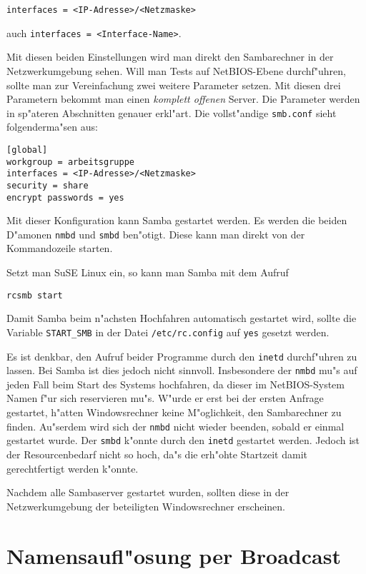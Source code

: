 \documentclass{scrartcl}\usepackage{pslatex}\typearea{12}
\newcommand{\prog}{\texttt}
\newcommand{\dateistyle}{\texttt}
\begin{document}
\begin{verbatim}
interfaces = <IP-Adresse>/<Netzmaske>
\end{verbatim}

\noindent auch \prog{interfaces = <Interface-Name>}.

Mit diesen beiden Einstellungen wird man direkt den Sambarechner in
der Netzwerkumgebung sehen. Will man Tests auf NetBIOS-Ebene
durchf"uhren, sollte man zur Vereinfachung zwei weitere Parameter
setzen. Mit diesen drei Parametern bekommt man einen \emph{komplett
  offenen} Server. Die Parameter werden in sp"ateren Abschnitten
genauer erkl"art. Die vollst"andige \dateistyle{smb.conf} sieht
folgenderma"sen aus:

\begin{verbatim}
[global]
workgroup = arbeitsgruppe
interfaces = <IP-Adresse>/<Netzmaske>
security = share
encrypt passwords = yes
\end{verbatim}

Mit dieser Konfiguration kann Samba gestartet werden. Es werden die
beiden D"amonen \prog{nmbd} und \prog{smbd} ben"otigt. Diese kann man
direkt von der Kommandozeile starten.

Setzt man SuSE Linux ein, so kann man Samba mit dem Aufruf

\begin{verbatim}
rcsmb start
\end{verbatim}

Damit Samba beim n"achsten Hochfahren automatisch gestartet wird,
sollte die Variable \texttt{START\_SMB} in der Datei
\dateistyle{/etc/rc.config} auf \texttt{yes} gesetzt werden.

Es ist denkbar, den Aufruf beider Programme durch den \prog{inetd}
durchf"uhren zu lassen. Bei Samba ist dies jedoch nicht sinnvoll.
Insbesondere der \prog{nmbd} mu"s auf jeden Fall beim Start des
Systems hochfahren, da dieser im NetBIOS-System Namen f"ur sich
reservieren mu"s. W"urde er erst bei der ersten Anfrage gestartet,
h"atten Windowsrechner keine M"oglichkeit, den Sambarechner zu finden.
Au"serdem wird sich der \prog{nmbd} nicht wieder beenden, sobald er
einmal gestartet wurde. Der \prog{smbd} k"onnte durch den \prog{inetd}
gestartet werden. Jedoch ist der Resourcenbedarf nicht so hoch, da"s
die erh"ohte Startzeit damit gerechtfertigt werden k"onnte.

Nachdem alle Sambaserver gestartet wurden, sollten diese in der
Netzwerkumgebung der beteiligten Windowsrechner erscheinen.

\section{Namensaufl"osung per Broadcast}
\end{document}
